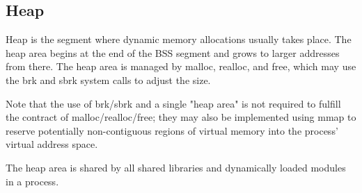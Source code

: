 \documentclass[a5paper,pagesize,10pt,bibtotoc,pointlessnumbers, normalheadings,DIV=9,twoside=false]{scrbook}
\begin{document}
\subsection{Heap}
Heap is the segment where dynamic memory allocations usually takes place.
The heap area begins at the end of the BSS segment and grows to larger addresses from there. 
The heap area is managed by malloc, realloc, and free, which may use the brk and sbrk system calls 
to adjust the size.

Note that the use of brk/sbrk and a single "heap area" is not required to fulfill the contract of 
malloc/realloc/free; they may also be implemented using mmap to reserve potentially non-contiguous 
regions of virtual memory into the process' virtual address space.

The heap area is shared by all shared libraries and dynamically loaded modules in a process. 

\end{document}
